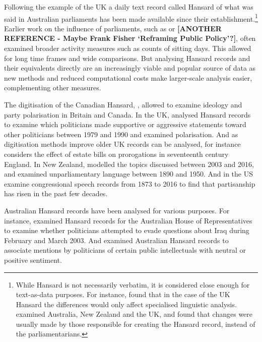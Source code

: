 \documentclass[12pt,]{article}
\theoremstyle{definition}
\theoremstyle{definition}
\theoremstyle{definition}
\theoremstyle{remark}
\begin{document}
Following the example of the UK a daily text record called Hansard of
what was said in Australian parliaments has been made available since
their establishment.\footnote{While Hansard is not necessarily verbatim,
  it is considered close enough for text-as-data purposes. For instance,
  \citet{Mollin2008} found that in the case of the UK Hansard the
  differences would only affect specialised linguistic analysis.
  \citet{Edwards2016} examined Australia, New Zealand and the UK, and
  found that changes were usually made by those responsible for creating
  the Hansard record, instead of the parliamentarians.} Earlier work on
the influence of parliaments, such as \citet{ZandenBuringhBosker2012} or
\textbf{{[}ANOTHER REFERENCE - Maybe Frank Fisher `Reframing Public
Policy'?{]}}, often examined broader activity measures such as counts of
sitting days. This allowed for long time frames and wide comparisons.
But analysing Hansard records and their equivalents directly are an
increasingly viable and popular source of data as new methods and
reduced computational costs make larger-scale analysis easier,
complementing other measures.

The digitisation of the Canadian Hansard, \citet{BeelenEtc2017}, allowed
\citet{RheaultCochran2018} to examine ideology and party polarisation in
Britain and Canada. In the UK, \citet{Duthie2016} analysed Hansard
records to examine which politicians made supportive or aggressive
statements toward other politicians between 1979 and 1990 and
\citet{PetersonSpirling2018} examined polarisation. And as digitisation
methods improve older UK records can be analysed, for instance
\citet{Dimitruk2018} considers the effect of estate bills on
prorogations in seventeenth century England. In New Zealand,
\citet{Curran2017} modelled the topics discussed between 2003 and 2016,
and \citet{Graham2016} examined unparliamentary language between 1890
and 1950. And in the US \citet{GentzkowShapiroTaddy2018} examine
congressional speech records from 1873 to 2016 to find that partisanship
has risen in the past few decades.

Australian Hansard records have been analysed for various purposes. For
instance, \citet{Rasiah2010} examined Hansard records for the Australian
House of Representatives to examine whether politicians attempted to
evade questions about Iraq during February and March 2003. And
\citet{GansLeigh2012} examined Australian Hansard records to associate
mentions by politicians of certain public intellectuals with neutral or
positive sentiment.
\end{document}
